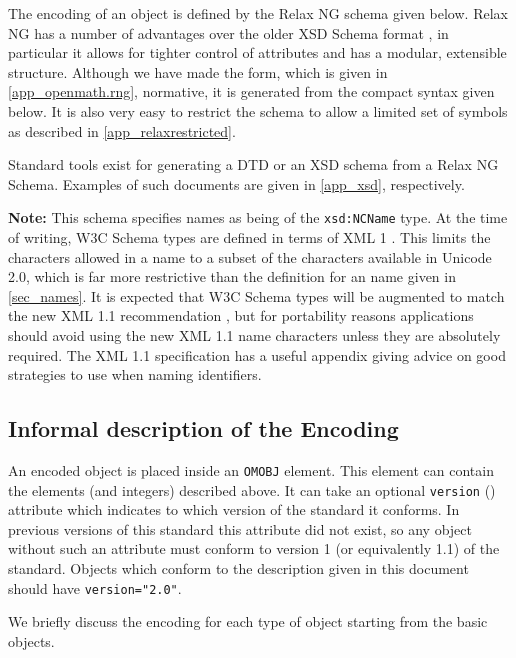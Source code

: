 The \XML encoding of an \OM object is defined by the Relax NG schema \cite{RELAX} given
below.  Relax NG has a number of advantages over the older XSD Schema format \cite{XSD},
in particular it allows for tighter control of attributes and has a modular, extensible
structure.  Although we have made the \XML form, which is given in \ref{app_openmath.rng},
normative, it is generated from the compact syntax given below.  It is also very easy to
restrict the schema to allow a limited set of \OM symbols as described in
\ref{app_relaxrestricted}.

Standard tools exist for generating a DTD or an XSD schema from a Relax NG Schema.
Examples of such documents are given in \ref{app_xsd}, respectively.



\textbf{Note:} This schema specifies names as being of the \lstinline|xsd:NCName| type. At
the time of writing, W3C Schema types are defined in terms of XML 1 \cite{xml_98}.  This
limits the characters allowed in a name to a subset of the characters available in Unicode
2.0, which is far more restrictive than the definition for an \OM name given in
\ref{sec_names}.  It is expected that W3C Schema types will be augmented to match the new
XML 1.1 recommendation \cite{xml_04}, but for portability reasons applications should
avoid using the new XML 1.1 name characters unless they are absolutely required.  The XML
1.1 specification has a useful appendix giving advice on good strategies to use when
naming identifiers.

\subsection{Informal description of the \XML Encoding}\label{sec_xml-desc}

An encoded \OM object is placed inside an \lstinline|OMOBJ| element.  This 
element can contain the elements (and integers) described above.
 It can take an optional
\lstinline|version| (\XML) attribute which indicates to
which version of the \OM standard it conforms.  In previous versions of
this standard this attribute did not exist, so any \OM object without
such an attribute must conform to version 1 (or equivalently 1.1) of the
\OM standard.  Objects which conform to the description given in this
document should have \lstinline|version="2.0"|.

We briefly discuss the \XML encoding for each type of \OM object starting from the basic
objects.

